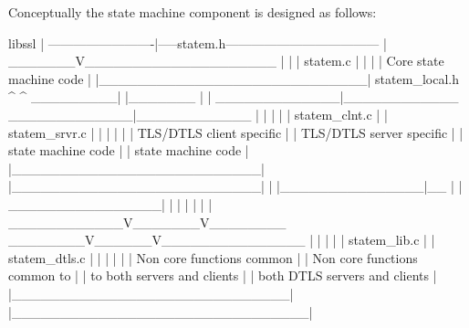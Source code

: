 Conceptually the state machine component is designed as follows\+: \begin{DoxyVerb}                      libssl
                         |
-------------------------|-----statem.h------------------------------------
                         |
                  _______V____________________
                 |                            |
                 |    statem.c                |
                 |                            |
                 |    Core state machine code |
                 |____________________________|
      statem_local.h     ^          ^
               _________|          |_______
              |                            |
 _____________|____________   _____________|____________
|                          | |                          |
| statem_clnt.c            | | statem_srvr.c            |
|                          | |                          |
| TLS/DTLS client specific | | TLS/DTLS server specific |
| state machine code       | | state machine code       |
|__________________________| |__________________________|
             |        |_______________|__       |
             |        ________________|  |      |
             |       |                   |      |
 ____________V_______V________   ________V______V_______________
|                             | |                               |
| statem_lib.c                | | statem_dtls.c                 |
|                             | |                               |
| Non core functions common   | | Non core functions common to  |
| to both servers and clients | | both DTLS servers and clients |
|_____________________________| |_______________________________|
\end{DoxyVerb}
 